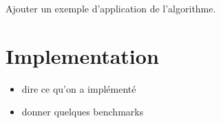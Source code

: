 \documentclass[a4paper]{llncs}
\def\todo#1{{\color{todo} #1}}
\begin{document}
\todo{Ajouter un exemple d'application de l'algorithme.}

\section{Implementation}

\todo{\begin{itemize}
\item dire ce qu'on a implémenté
\item donner quelques benchmarks
\end{itemize}}
\end{document}
